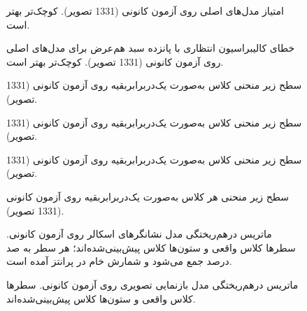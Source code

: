 \begin{figure}[htbp]
  \centering
  \caption{امتیاز  مدل‌های اصلی روی آزمون کانونی (1331 تصویر). کوچک‌تر بهتر است.}
  \label{fig:U32}
\end{figure}

\begin{figure}[htbp]
  \centering
  \caption{خطای کالیبراسیون انتظاری با پانزده سبد هم‌عرض برای مدل‌های اصلی روی آزمون کانونی (1331 تصویر). کوچک‌تر بهتر است.}
  \label{fig:U33}
\end{figure}

\begin{figure}[htbp]
  \centering
  \caption{سطح زیر منحنی کلاس  به‌صورت یک‌دربرابر‌بقیه روی آزمون کانونی (1331 تصویر).}
  \label{fig:U34}
\end{figure}

\begin{figure}[htbp]
  \centering
  \caption{سطح زیر منحنی کلاس  به‌صورت یک‌دربرابر‌بقیه روی آزمون کانونی (1331 تصویر).}
  \label{fig:U35}
\end{figure}

\begin{figure}[htbp]
  \centering
  \caption{سطح زیر منحنی کلاس  به‌صورت یک‌دربرابر‌بقیه روی آزمون کانونی (1331 تصویر).}
  \label{fig:U36}
\end{figure}

\begin{figure}[htbp]
  \centering
  \caption{سطح زیر منحنی هر کلاس به‌صورت یک‌دربرابر‌بقیه روی آزمون کانونی (1331 تصویر).}
  \label{fig:U37}
\end{figure}

\begin{figure}[htbp]
  \centering
  \caption{ماتریس درهم‌ریختگی مدل نشانگرهای اسکالر روی آزمون کانونی. سطرها کلاس واقعی و ستون‌ها کلاس پیش‌بینی‌شده‌اند؛ هر سطر به صد درصد جمع می‌شود و شمارش خام در پرانتز آمده است.}
  \label{fig:U38}
\end{figure}

\begin{figure}[htbp]
  \centering
  \caption{ماتریس درهم‌ریختگی مدل بازنمایی تصویری روی آزمون کانونی. سطرها کلاس واقعی و ستون‌ها کلاس پیش‌بینی‌شده‌اند.}
  \label{fig:U39}
\end{figure}

